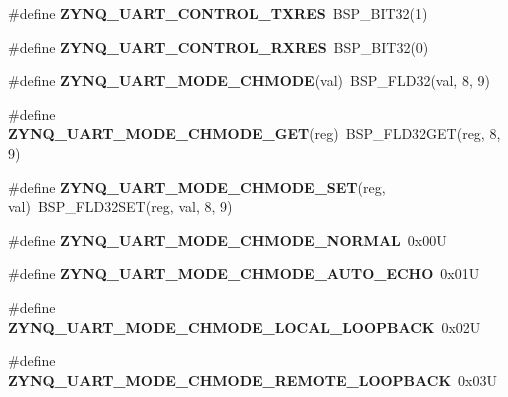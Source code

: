 \begin{DoxyCompactItemize}
\#define {\bfseries Z\+Y\+N\+Q\+\_\+\+U\+A\+R\+T\+\_\+\+C\+O\+N\+T\+R\+O\+L\+\_\+\+T\+X\+R\+ES}~B\+S\+P\+\_\+\+B\+I\+T32(1)
\item 
\mbox{\label{zynq-uart-regs_8h_a312f111b56c0c683cc1feae85bcba42a}} 
\#define {\bfseries Z\+Y\+N\+Q\+\_\+\+U\+A\+R\+T\+\_\+\+C\+O\+N\+T\+R\+O\+L\+\_\+\+R\+X\+R\+ES}~B\+S\+P\+\_\+\+B\+I\+T32(0)
\item 
\mbox{\label{zynq-uart-regs_8h_a614de8437c3db0bdd35a1d697581538f}} 
\#define {\bfseries Z\+Y\+N\+Q\+\_\+\+U\+A\+R\+T\+\_\+\+M\+O\+D\+E\+\_\+\+C\+H\+M\+O\+DE}(val)~B\+S\+P\+\_\+\+F\+L\+D32(val, 8, 9)
\item 
\mbox{\label{zynq-uart-regs_8h_a483174ffda19d1e8ecb860504a544dd9}} 
\#define {\bfseries Z\+Y\+N\+Q\+\_\+\+U\+A\+R\+T\+\_\+\+M\+O\+D\+E\+\_\+\+C\+H\+M\+O\+D\+E\+\_\+\+G\+ET}(reg)~B\+S\+P\+\_\+\+F\+L\+D32\+G\+ET(reg, 8, 9)
\item 
\mbox{\label{zynq-uart-regs_8h_a2558f1548a8ef89a394bded3df31893b}} 
\#define {\bfseries Z\+Y\+N\+Q\+\_\+\+U\+A\+R\+T\+\_\+\+M\+O\+D\+E\+\_\+\+C\+H\+M\+O\+D\+E\+\_\+\+S\+ET}(reg,  val)~B\+S\+P\+\_\+\+F\+L\+D32\+S\+ET(reg, val, 8, 9)
\item 
\mbox{\label{zynq-uart-regs_8h_ac671d4d7d3b87bd95eed9a5a521caaf8}} 
\#define {\bfseries Z\+Y\+N\+Q\+\_\+\+U\+A\+R\+T\+\_\+\+M\+O\+D\+E\+\_\+\+C\+H\+M\+O\+D\+E\+\_\+\+N\+O\+R\+M\+AL}~0x00U
\item 
\mbox{\label{zynq-uart-regs_8h_ab53e7243b36423c3f3baeffd57243a5d}} 
\#define {\bfseries Z\+Y\+N\+Q\+\_\+\+U\+A\+R\+T\+\_\+\+M\+O\+D\+E\+\_\+\+C\+H\+M\+O\+D\+E\+\_\+\+A\+U\+T\+O\+\_\+\+E\+C\+HO}~0x01U
\item 
\mbox{\label{zynq-uart-regs_8h_a8886e3446cef7c0ef962d27fc6311483}} 
\#define {\bfseries Z\+Y\+N\+Q\+\_\+\+U\+A\+R\+T\+\_\+\+M\+O\+D\+E\+\_\+\+C\+H\+M\+O\+D\+E\+\_\+\+L\+O\+C\+A\+L\+\_\+\+L\+O\+O\+P\+B\+A\+CK}~0x02U
\item 
\mbox{\label{zynq-uart-regs_8h_a0579300e612fe8aa709c9de1a556a856}} 
\#define {\bfseries Z\+Y\+N\+Q\+\_\+\+U\+A\+R\+T\+\_\+\+M\+O\+D\+E\+\_\+\+C\+H\+M\+O\+D\+E\+\_\+\+R\+E\+M\+O\+T\+E\+\_\+\+L\+O\+O\+P\+B\+A\+CK}~0x03U

\end{DoxyCompactItemize}
